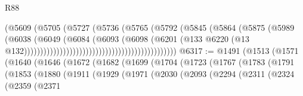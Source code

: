 \begin{lexlean}{R88}
\begin{coremodule}
                                                              (@5609
                                                                (@5705
                                                                  (@5727
                                                                    (@5736
                                                                      (@5765
                                                                        (@5792
                                                                          (@5845
                                                                            (@5864
                                                                              (@5875
                                                                                (@5989
                                                                                  (@6038
                                                                                    (@6049
                                                                                      (@6084
                                                                                        (@6093
                                                                                          (@6098
                                                                                            (@6201
                                                                                              (@133
                                                                                                @6220
                                                                                                (@13
                                                                                                  @132)))))))))))))))))))))))))))))))))))))))))))))))
@6317 := @1491
    (@1513
      (@1571
        (@1640
          (@1646
            (@1672
              (@1682
                (@1699
                  (@1704
                    (@1723
                      (@1767
                        (@1783
                          (@1791
                            (@1853
                              (@1880
                                (@1911
                                  (@1929
                                    (@1971
                                      (@2030
                                        (@2093
                                          (@2294
                                            (@2311
                                              (@2324
                                                (@2359
                                                  (@2371

\end{coremodule}
\end{lexlean}
